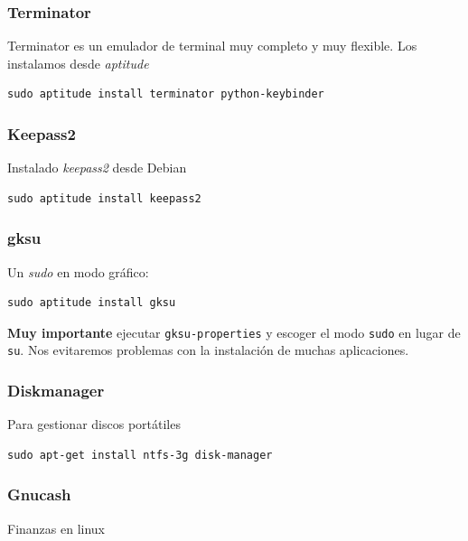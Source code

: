 \documentclass[12pt,spanish,]{scrartcl}
\begin{document}
\subsubsection{Terminator}\label{terminator}

Terminator es un emulador de terminal muy completo y muy flexible. Los
instalamos desde \emph{aptitude}

\begin{verbatim}
sudo aptitude install terminator python-keybinder
\end{verbatim}

\subsubsection{Keepass2}\label{keepass2}

Instalado \emph{keepass2} desde Debian

\begin{verbatim}
sudo aptitude install keepass2
\end{verbatim}

\subsubsection{gksu}\label{gksu}

Un \emph{sudo} en modo gráfico:

\begin{verbatim}
sudo aptitude install gksu
\end{verbatim}

\textbf{Muy importante} ejecutar \texttt{gksu-properties} y escoger el
modo \texttt{sudo} en lugar de \texttt{su}. Nos evitaremos problemas con
la instalación de muchas aplicaciones.

\subsubsection{Diskmanager}\label{diskmanager}

Para gestionar discos portátiles

\begin{verbatim}
sudo apt-get install ntfs-3g disk-manager
\end{verbatim}

\subsubsection{Gnucash}\label{gnucash}

Finanzas en linux
\end{document}
